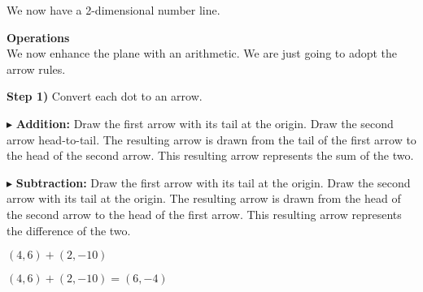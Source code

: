 \documentclass{ximera}
\begin{document}
We now have a 2-dimensional number line.








\textbf{\textcolor{red!25!blue!75!}{Operations}} \\



We now enhance the plane with an arithmetic.  We are just going to adopt the arrow rules.  

\textbf{Step 1)} Convert each dot to an arrow.


$\blacktriangleright$ \textbf{Addition:}  Draw the first arrow with its tail at the origin.  Draw the second arrow head-to-tail. The  resulting arrow is drawn from the tail of the first arrow to the head of the second arrow.  This resulting arrow represents the sum of the two.



$\blacktriangleright$ \textbf{Subtraction:}  Draw the first arrow with its tail at the origin.  Draw the second arrow with its tail at the origin. The resulting arrow is drawn from the head of the second arrow to the head of the first arrow.  This resulting arrow represents the difference of the two.



\begin{example}


$(4,6) + (2, -10)$


\begin{image}
\end{image}


$(4,6) + (2, -10) = (6, -4)$


\end{example}
\end{document}
